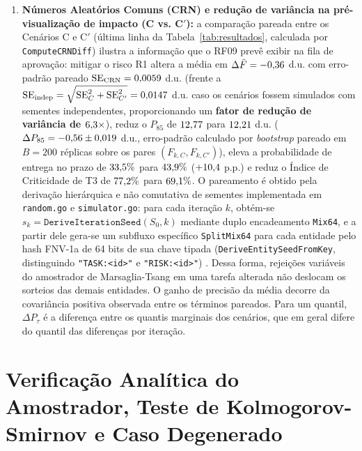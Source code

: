 \documentclass[12pt,openany,oneside,a4paper,english,brazilian,sumario=tradicional]{abntex2}
\begin{document}
\begin{enumerate}
  \item \textbf{Números Aleatórios Comuns (CRN) e redução de variância na pré-visualização de impacto (C vs. C$'$):} a comparação pareada entre os Cenários C e C$'$ (última linha da Tabela~\ref{tab:resultados}, calculada por \texttt{ComputeCRNDiff}) ilustra a informação que o RF09 prevê exibir na fila de aprovação: mitigar o risco R1 altera a média em $\Delta\bar{F} = -0{,}36{}$ d.u. com erro-padrão pareado $\mathrm{SE}_{\mathrm{CRN}} = 0{,}0059{}$ d.u. (frente a $\mathrm{SE}_{\mathrm{indep}} = \sqrt{\mathrm{SE}_C^2 + \mathrm{SE}_{C'}^2} = 0{,}0147{}$ d.u. caso os cenários fossem simulados com sementes independentes, proporcionando um \textbf{fator de redução de variância de $6{,}3{}\times$}), reduz o $P_{85}$ de $12{,}77{}$ para $12{,}21{}$ d.u. ($\Delta P_{85} = -0{,}56{} \pm 0{,}019{}$ d.u., erro-padrão calculado por \textit{bootstrap} pareado em $B=200$ réplicas sobre os pares $(F_{k,C}, F_{k,C'})$), eleva a probabilidade de entrega no prazo de $33{,}5{}\%$ para $43{,}9{}\%$ ($+10{,}4{}$ p.p.) e reduz o Índice de Criticidade de T3 de $77{,}2{}\%$ para $69{,}1{}\%$. O pareamento é obtido pela derivação hierárquica e não comutativa de sementes implementada em \texttt{random.go} e \texttt{simulator.go}: para cada iteração $k$, obtém-se $s_k = \texttt{DeriveIterationSeed}(S_0, k)$ mediante duplo encadeamento \texttt{Mix64}, e a partir dele gera-se um subfluxo específico \texttt{SplitMix64} para cada entidade pelo hash FNV-1a de 64 bits de sua chave tipada (\texttt{DeriveEntitySeedFromKey}, distinguindo \texttt{"TASK:<id>"} e \texttt{"RISK:<id>"}) \cite{steele2014,lecuyer2017}. Dessa forma, rejeições variáveis do amostrador de Marsaglia-Tsang em uma tarefa alterada não deslocam os sorteios das demais entidades. O ganho de precisão da média decorre da covariância positiva observada entre os términos pareados. Para um quantil, $\Delta P_\tau$ é a diferença entre os quantis marginais dos cenários, que em geral difere do quantil das diferenças por iteração.
\end{enumerate}

\section{Verificação Analítica do Amostrador, Teste de Kolmogorov-Smirnov e Caso Degenerado}\label{sec:ks_test}
\end{document}

